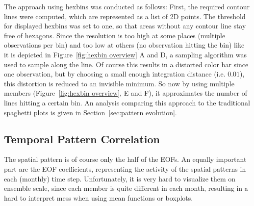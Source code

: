 The approach using hexbins was conducted as follows: First, the required contour lines were computed, which are represented as a list of 2D points. 
The threshold for displayed hexbins was set to one, so that areas without any contour line stay free of hexagons. 
Since the resolution is too high at some places (multiple observations per bin) and too low at others (no observation hitting the bin) like it is depicted in Figure~\ref{fig:hexbin overview} A and D, a sampling algorithm  was used to sample along the line. 
Of course this results in a distorted color bar since one observation, but by choosing a small enough integration distance (i.e. $0.01$), this distortion is reduced to an invisible minimum. 
So now by using multiple members (Figure~\ref{fig:hexbin overview}, E and F), it approximates the number of lines hitting a certain bin. 
An analysis comparing this approach to the traditional spaghetti plots is given in Section~\ref{sec:pattern evolution}. 



\subsection{Temporal Pattern Correlation} %
\label{sec:Temporal Pattern Correlation}

The spatial pattern is of course only the half of the EOFs. 
An equally important part are the EOF coefficients, representing the activity of the spatial patterns in each (monthly) time step. 
Unfortunately, it is very hard to visualize them on ensemble scale, since each member is quite different in each month, resulting in a hard to interpret mess when using mean functions or boxplots. 

